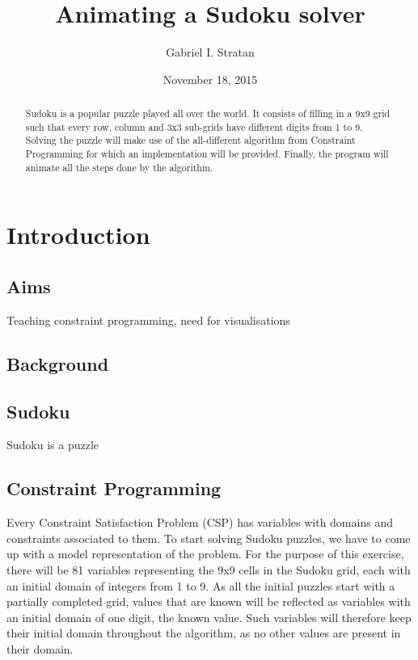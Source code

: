 \documentclass{l4proj}
\begin{document}
\title{Animating a Sudoku solver}
\author{Gabriel I. Stratan}
\date{November 18, 2015}
\maketitle

\begin{abstract}
Sudoku is a popular puzzle played all over the world. It consists of filling in a 9x9 grid such that every row, column and 3x3 sub-grids have different digits from 1 to 9. Solving the puzzle will make use of the all-different algorithm from Constraint Programming for which an implementation will be provided. Finally, the program will animate all the steps done by the algorithm.
\end{abstract}

\educationalconsent
%
%
\chapter{Introduction}
\label{intro}

\section{Aims}
Teaching constraint programming, need for visualisations

\section{Background}

\section{Sudoku}
\noindent Sudoku is a puzzle 

\section{Constraint Programming}
\noindent Every Constraint Satisfaction Problem (CSP) has variables with domains and constraints associated to them. To start solving Sudoku puzzles, we have to come up with a model representation of the problem. For the purpose of this exercise, there will be 81 variables representing the 9x9 cells in the Sudoku grid, each with an initial domain of integers from 1 to 9. As all the initial puzzles start with a partially completed grid, values that are known will be reflected as variables with an initial domain of one digit, the known value. Such variables will therefore keep their initial domain throughout the algorithm, as no other values are present in their domain.
\end{document}
